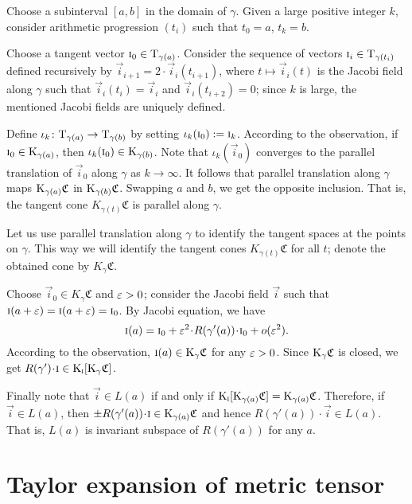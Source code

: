 \documentclass[a4paper,10pt]{article}
\begin{document}
Choose a subinterval $[a,b]$ in the domain of $\gamma$.
Given a large positive integer $k$, consider arithmetic progression
$(t_i)$ such that $t_0=a$, $t_k=b$.

Choose a tangent vector $\text{\sc{i}}_0\in\mathrm{T}_{\gamma(a)}$. 
Consider the sequence of vectors $\vec{i}_i\z\in\T_{\gamma(t_i)}$ defined recursively by $\vec{i}_{i+1}=2\cdot \vec{i}_i(t_{i+1})$, where $t\mapsto \vec{i}_i(t)$ is the Jacobi field along $\gamma$ such that $\vec{i}_i(t_i)=\vec{i}_i$ and $\vec{i}_i(t_{i+2})=0$;
since $k$ is large, the mentioned Jacobi fields are uniquely defined.

Define $\iota_k\colon\mathrm{T}_{\gamma(a)}\to \mathrm{T}_{\gamma(b)}$ by setting $\iota_k(\text{\sc{i}}_0)\mathrel{{:}{=}} \text{\sc{i}}_k$.
According to the observation, if $\text{\sc{i}}_0\in \mathrm{K}_{\gamma(a)}$, then $\iota_k(\text{\sc{i}}_0)\in \mathrm{K}_{\gamma(b)}$.
Note that $\iota_k(\vec{i}_0)$ converges to the parallel translation of $\vec{i}_0$ along $\gamma$ as $k\to \infty$.
It follows that parallel translation along $\gamma$ maps $\mathrm{K}_{\gamma(a)}\mathfrak{C}$ in $\mathrm{K}_{\gamma(b)}\mathfrak{C}$.
Swapping $a$ and $b$, we get the opposite inclusion.
That is, the tangent cone $K_{\gamma(t)}\mathfrak{C}$ is parallel along $\gamma$.

Let us use parallel translation along $\gamma$ to identify the tangent spaces at the points on $\gamma$.
This way we will identify the tangent cones $K_{\gamma(t)}\mathfrak{C}$ for all $t$;
denote the obtained cone by $K_\gamma\mathfrak{C}$.

Choose $\vec{i}_0\in K_\gamma\mathfrak{C}$ and $\varepsilon>0$;
consider the Jacobi field $\vec{i}$ such that $\vec{i}(a+\eps)\z=\vec{i}(a+\eps)=\vec{i}_0$.
By Jacobi equation, we have
\[\vec{i}(a)=\vec{i}_0+\eps^2\cdot R(\gamma'(a))\cdot \vec{i}_0+o(\eps^2).\]
According to the observation, $\text{\sc{i}}(a)\in \mathrm{K}_{\gamma} \mathfrak{C}$ for any $\varepsilon>0$.
Since $\mathrm{K}_{\gamma} \mathfrak{C}$ is closed, we get $R(\gamma')\cdot \vec{i}\z\in \K_\vec{i}[\K_\gamma\mathfrak{C}]$.

Finally note that $\vec{i}\in L(a)$ if and only if $\mathrm{K}_{\text{\sc{i}}}[\mathrm{K}_{\gamma(a)}\mathfrak{C}]=\mathrm{K}_{\gamma(a)}\mathfrak{C}$.
Therefore, if $\vec{i}\in L(a)$, then $\pm R(\gamma'(a))\cdot \vec{i}\in \K_{\gamma(a)}\mathfrak{C}$ and hence $R(\gamma'(a))\cdot \vec{i}\in L(a)$.
That is, $L(a)$ is invariant subspace of $ R(\gamma'(a))$ for any $a$.
\qeds
  
\section{Taylor expansion of metric tensor}\label{sec:jet}
\end{document}
